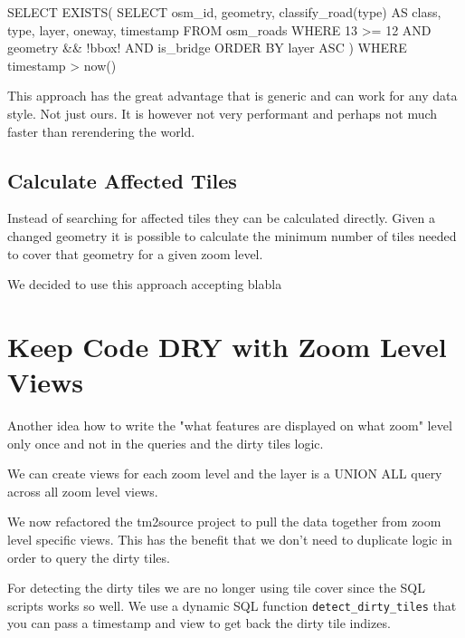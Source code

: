 \begin{sqlcode}

SELECT EXISTS(
    SELECT osm_id, geometry, classify_road(type) AS class, type, layer, oneway, timestamp
    FROM osm_roads
    WHERE 13 >= 12 
    AND geometry && !bbox! 
    AND is_bridge
    ORDER BY layer ASC
) WHERE timestamp > now()

\end{sqlcode}

This approach has the great advantage that is generic and can work for any data style.
Not just ours. It is however not very performant and perhaps not much faster than rerendering
the world.

\subsection{Calculate Affected Tiles}

Instead of searching for affected tiles they can be calculated directly.
Given a changed geometry it is possible to calculate the minimum number of tiles
needed to cover that geometry for a given zoom level.

\begin{tcolorbox}[arc=0mm,boxrule=1pt,title=Decision]\label{dirty_tiles_decision}
We decided to use this approach accepting blabla
\end{tcolorbox}

\section{Keep Code DRY with Zoom Level Views}
Another idea how to write the "what features are displayed on what zoom" level only once and not in the queries and the dirty tiles logic.

We can create views for each zoom level and the layer is a UNION ALL query across all zoom level views.

We now refactored the tm2source project to pull the data together from zoom level specific views. This has the benefit that we don't need to duplicate logic in order to query the dirty tiles.

For detecting the dirty tiles we are no longer using tile cover since the SQL scripts works so well. We use a dynamic SQL function \texttt{detect\_dirty\_tiles} that you can pass a timestamp and view to get back the dirty tile indizes.

